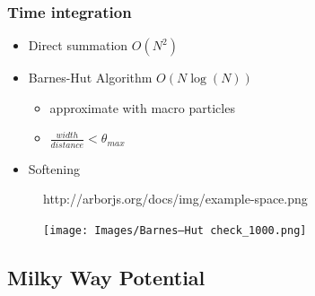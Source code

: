\documentclass{beamer}
\begin{document}
\begin{frame}
\frametitle{Time integration}

\begin{itemize}
\item Direct summation \(O(N^2)\)
\item Barnes-Hut Algorithm \(O(N\log(N))\)
	\begin{itemize}
	 \item approximate with macro particles
	 \item \(\frac{width}{distance} < \theta_{max}\)
	\end{itemize}
\item Softening
\end{itemize}

\end{frame}


\begin{frame}
\begin{figure}
\centering
{}
                  {http://arborjs.org/docs/img/example-space.png}
\end{figure}
\end{frame}

\begin{frame}
\begin{figure}
\centering
\texttt{[image: Images/Barnes–Hut check\_1000.png]}
\end{figure}
\end{frame}


\subsection{Milky Way Potential}
\end{document}
